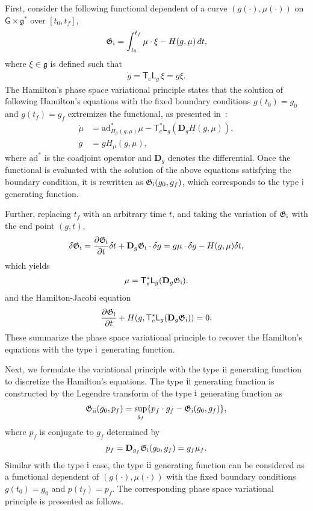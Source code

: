 \documentclass[letterpaper, 10pt, conference]{ieeeconf}
\newcommand{\deriv}[2]{\ensuremath{\frac{\partial #1}{\partial #2}}}
\newcommand{\G}{\ensuremath{\mathsf{G}}}
\newcommand{\T}{\ensuremath{\mathsf{T}}}
\renewcommand{\L}{\ensuremath{\mathsf{L}}}
\newcommand{\D}{\ensuremath{\mathbf{D}}}
\newcommand{\ad}{\ensuremath{\mathrm{ad}}}
\newcommand{\g}{\ensuremath{\mathfrak{g}}}
\newcommand{\RomanNumeralCaps}[1]{\textup{\uppercase\expandafter{\romannumeral#1}}}
\newcommand{\RI}{\RomanNumeralCaps{1}}
\newcommand{\RII}{\RomanNumeralCaps{2}}
\begin{document}
First, consider the following functional dependent of a curve $(g(\cdot),\mu(\cdot))$ on $\G\times \g^*$ over $[t_0,t_f]$,
\begin{align}
    \mathfrak{G}_\RI = \int_{t_0}^{t_f} \mu \cdot \xi - H(g,\mu) \, dt,\label{eqn:G10}
\end{align}
where $\xi\in\g$ is defined such that
\begin{align}
    \dot g = \T_e \L_{g}\, \xi = g\xi.\label{eqn:g_dot}
\end{align}
The Hamilton's phase space variational principle states that the solution of following Hamilton's equations with the fixed boundary conditions $g(t_0)=g_0$ and $g(t_f)=g_f$ extremizes the functional, as presented in~\cite[Section 8.6.5]{LeeLeo17}:
\begin{align}
    \dot \mu & = \ad^*_{H_\mu(g,\mu)} \mu - \T^*_e \L_g (\D_g H(g,\mu)),\label{eqn:mu_dot}\\
    \dot g & = g H_\mu (g,\mu),\label{eqn:g_dot_H}
\end{align}
where $\ad^*$ is the coadjoint operator and $\D_g$ denotes the differential. 
Once the functional is evaluated with the solution of the above equations satisfying the boundary condition, it is rewritten as $\mathfrak{G}_\RI(g_0, g_f)$, which corresponds to the type $\RI$ generating function.

Further, replacing $t_f$ with an arbitrary time $t$, and taking the variation of $\mathfrak{G}_\RI$ with the end point $(g, t)$,
\begin{align}
    \delta\mathfrak{G}_\RI = \deriv{ \mathfrak{G}_\RI}{t} \delta t + \D_g\mathfrak{G}_\RI \cdot \delta g  = g\mu \cdot \delta g - H(g,\mu) \delta t,\label{eqn:G1}
\end{align}
which yields
\begin{align}
    \mu =\T^*_e \L_g (\D_g \mathfrak{G}_\RI).
\end{align}
and the Hamilton-Jacobi equation
\begin{align}
    \deriv{ \mathfrak{G}_\RI}{t} + H(g, \T^*_e \L_g (\D_g \mathfrak{G}_\RI )) = 0.
\end{align}
These summarize the phase space variational principle to recover the Hamilton's equations with the type $\RI$ generating function. 

Next, we formulate the variational principle with the type $\RII$ generating function to discretize the Hamilton's equations.
The type $\RII$ generating function is constructed by the Legendre transform of the type $\RI$ generating function as
\begin{align}
    \mathfrak{G}_\RII (g_0, p_f) = \sup_{g_f}  \{ p_f \cdot g_f - \mathfrak{G}_\RI (g_0,g_f) \},\label{eqn:G2}
\end{align}
where $p_f$ is conjugate to $g_f$ determined by
\begin{align}
    p_f = \D_{g_f} \mathfrak{G}_\RI (g_0,g_f) = g_f\mu_f.
\end{align}
Similar with the type $\RI$ case, the type $\RII$ generating function can be considered as a functional dependent of $(g(\cdot),\mu(\cdot))$ with the fixed boundary conditions $g(t_0)=g_0$ and $p(t_f)=p_f$.
The corresponding phase space variational principle is presented as follows.
\end{document}
